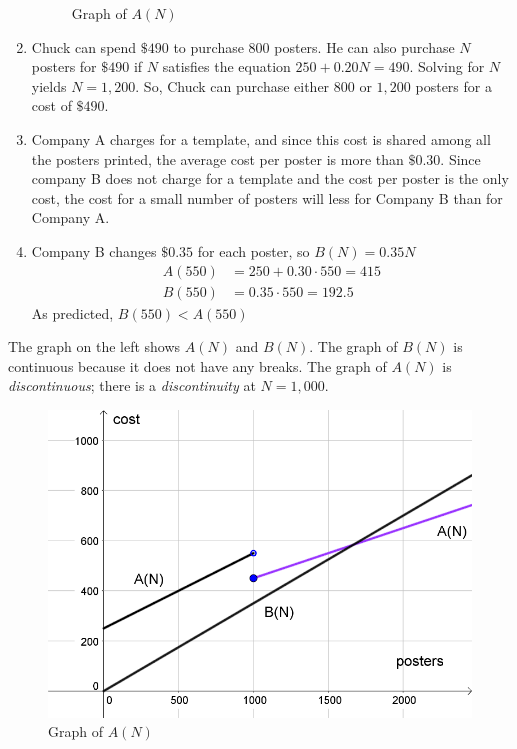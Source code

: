 \documentclass[10pt,]{book}
\theoremstyle{ptxdefinitionnotitle}
\theoremstyle{ptxdefinitiontitle}
\numberwithin{equation}{section}
\newcommand{\lt}{<}
\newcommand{\amp}{&}
\begin{document}
\begin{example}
\begin{enumerate}[label=\alph*)]
\begin{figure}
\caption{Graph of \(A(N)\)\label{figure-4}}
\end{figure}
\item\hypertarget{li-6}{}\hypertarget{p-13}{}%
Chuck can spend \(\$490\) to purchase \(800\) posters. He can also purchase \(N\) posters for \(\$490\) if \(N\) satisfies the equation \(250 + 0.20N = 490\). Solving for \(N\) yields \(N = 1,200\). So, Chuck can purchase either \(800\) or \(1,200\) posters for a cost of \(\$490\).%
\item\hypertarget{li-7}{}\hypertarget{p-14}{}%
Company A charges for a template, and since this cost is shared among all the posters printed, the average cost per poster is more than \(\$0.30\). Since company B does not charge for a template and the cost per poster is the only cost, the cost for a small number of posters will less for Company B than for Company A.%
\item\hypertarget{li-8}{}\hypertarget{p-15}{}%
Company B changes \(\$0.35\) for each poster, so \(B(N) = 0.35N\)%
\begin{align*}
A(550) \amp = 250 + 0.30 \cdot 550 = 415\\
B(550) \amp = 0.35 \cdot 550 = 192.5
\end{align*}
As predicted, \(B(550) \lt A(550)\)%
\end{enumerate}
\end{example}
\hypertarget{p-16}{}%
The graph on the left shows \(A(N)\) and \(B(N)\). The graph of \(B(N)\) is continuous because it does not have any breaks. The graph of \(A(N)\) is \emph{discontinuous}; there is a \emph{discontinuity} at \(N = 1,000\).%
\begin{figure}
\centering
\includegraphics[width=1\linewidth]{./src/images/chapter02/chapter02section01-example01-after-graph.png}
\caption{Graph of \(A(N)\)\label{figure-5}}
\end{figure}
\end{document}

